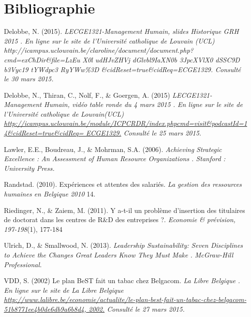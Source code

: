 \pagebreak
\section*{Bibliographie}

Delobbe, N. (2015). \it LECGE1321-Management Humain, slides Historique GRH 2015 \normalfont. En ligne sur le site de l’Université catholique de Louvain (UCL) http://icampus.uclouvain.be/claroline/document/document.php?cmd=exChDir\&file=LzEu X0l udHJvZHVj dGlvbl9IaXN0b 3JpcXVlX0 dSSC9D b3Vyc19 tYWdpc3 RyYWw\%3D \&cidReset=true\&cidReq=ECGE1329. Consulté le 30 mars 2015. \newline

Delobbe, N., Thiran, C., Nolf, F., \& Goergen, A. (2015) \it LECGE1321-Management Humain, vidéo table ronde du 4 mars 2015 \normalfont. En ligne sur le site de l’Université catholique de Louvain(UCL) \url{http://icampus.uclouvain.be/module/ICPCRDR/index.phpcmd=visit\&podcastId=14\&cidReset=true\&cidReq= ECGE1329.} Consulté le 25 mars 2015. \newline

Lawler, E.E., Boudreau, J., \& Mohrman, S.A. (2006). \it Achieving Strategic Excellence : An Assessment of Human Resource Organizations \normalfont. Stanford : University Press.\newline

Randstad. (2010). Expériences et attentes des salariés. \textit{La gestion des ressources humaines en Belgique 2010} 14.\newline

Riedinger, N., \& Zaiem, M. (2011). Y a-t-il un problème d’insertion des titulaires de doctorat dans les centres de R\&D des entreprises ?. \textit{Economie \& prévision, 197-198}(1), 177-184 \newline

Ulrich, D., \& Smallwood, N. (2013). \it Leadership Sustainability: Seven Disciplines to Achieve the Changes Great Leaders Know They Must Make \normalfont. McGraw-Hill Professional.\newline

VDD, S. (2002) Le plan BeST fait un tabac chez Belgacom. \it La Libre Belgique \normalfont. En ligne sur le site de La Libre Belgique \url{http://www.lalibre.be/economie/actualite/le-plan-best-fait-un-tabac-chez-belgacom-51b8771ee4b0de6db9a6b8d4, 2002.} Consulté le 27 mars 2015. 
